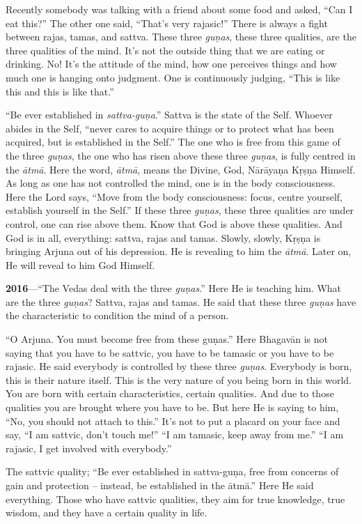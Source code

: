 Recently somebody was talking with a friend about some food and asked, “Can I eat this?” The other one said, “That’s very rajasic!” There is always a fight between rajas, tamas, and sattva. These three \textit{guṇas}, these three qualities, are the three qualities of the mind. It’s not the outside thing that we are eating or drinking. No! It’s the attitude of the mind, how one perceives things and how much one is hanging onto judgment. One is continuously judging, “This is like this and this is like that.”

“Be ever established in \textit{sattva-guṇa}.” Sattva is the state of the Self. Whoever abides in the Self, “never cares to acquire things or to protect what has been acquired, but is established in the Self.” The one who is free from this game of the three \textit{guṇas}, the one who has risen above these three \textit{guṇas}, is fully centred in the \textit{ātmā}. Here the word, \textit{ātmā}, means the Divine, God, Nārāyaṇa Kṛṣṇa Himself. As long as one has not controlled the mind, one is in the body consciousness. Here the Lord says, “Move from the body consciousness: focus, centre yourself, establish yourself in the Self.” If these three \textit{guṇas}, these three qualities are under control, one can rise above them. Know that God is above these qualities. And God is in all, everything: sattva, rajas and tamas. Slowly, slowly, Kṛṣṇa is bringing Arjuna out of his depression. He is revealing to him the \textit{ātmā}. Later on, He will reveal to him God Himself.

\textbf{2016}---“The Vedas deal with the three \textit{guṇas}.” Here He is teaching him. What are the three \textit{guṇas}? Sattva, rajas and tamas. He said that these three \textit{guṇas} have the characteristic to condition the mind of a person.

“O Arjuna. You must become free from these guṇas.” Here Bhagavān is not saying that you have to be sattvic, you have to be tamasic or you have to be rajasic. He said everybody is controlled by these three \textit{guṇas}. Everybody is born, this is their nature itself. This is the very nature of you being born in this world. You are born with certain characteristics, certain qualities. And due to those qualities you are brought where you have to be. But here He is saying to him, “No, you should not attach to this.” It’s not to put a placard on your face and say, “I am sattvic, don’t touch me!” “I am tamasic, keep away from me.” “I am rajasic, I get involved with everybody.”

The sattvic quality; “Be ever established in sattva-guṇa, free from concerns of gain and protection -- instead, be established in the ātmā.” Here He said everything. Those who have sattvic qualities, they aim for true knowledge, true wisdom, and they have a certain quality in life.

